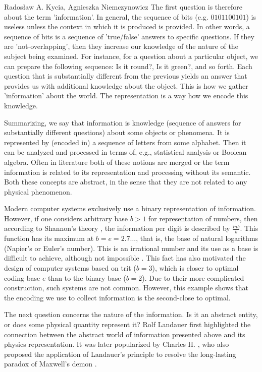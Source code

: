 \begin{artengenv2auth}{Rados\l aw A. Kycia, Agnieszka Niemczynowicz}
The first question is therefore about the term 'information'. In general, the sequence of bits (e.g. $0101100101$) is useless unless the context in which it is produced is provided. In other words, a sequence of bits is a sequence of 'true/false' answers to specific questions. If they are 'not-overlapping', then they increase our knowledge of the nature of the subject being examined. For instance, for a question about a particular object, we can prepare the following sequence: Is it round?, Is it green?, and so forth. Each question that is substantially different from the previous yields an answer that provides us with additional knowledge about the object. This is how we gather 'information' about the world. The representation is a way how we encode this knowledge. 

Summarizing, we say that information is knowledge (sequence of answers for substantially different questions) about some objects or phenomena. It is represented by (encoded in) a sequence of letters from some alphabet. Then it can be analyzed and processed in terms of, e.g., statistical analysis or Boolean algebra. Often in literature both of these notions are merged \parencite{InformationEntropy} or the term information is related to its representation and processing without its semantic. Both these concepts are abstract, in the sense that they are not related to any physical phenomenon.

Modern computer systems exclusively use a binary representation of information. However, if one considers arbitrary base $b>1$ for representation of numbers, then according to Shannon's theory \parencite{InformationEntropy}, the information per digit is described by $\frac{ln{b}}{b}$. This function has its maximum at $b=e=2.7\ldots$, that is, the base of natural logarithms (Napier's or Euler's number). This is an irrational number and its use as a base is difficult to achieve, although not impossible \parencite{ThirdBase}. This fact has also motivated the design of computer systems based on trit ($b=3$), which is closer to optimal coding base $e$ than to the binary base ($b=2$). Due to their more complicated construction, such systems are not common. However, this example shows that the encoding we use to collect information is the second-close to optimal.

The next question concerns the nature of the information. Is it an abstract entity, or does some physical quantity represent it? Rolf Landauer \parencite*{ Landauer} first highlighted the connection between the abstract world of information presented above and its physics representation. It was later popularized by Charles H.  \textcite{Bennet}, who also proposed the application of  Landauer's principle to resolve the long-lasting paradox of Maxwell's demon \parencite{BennetDemon}. 


\end{artengenv2auth}
